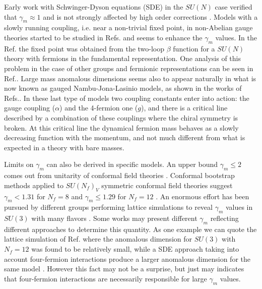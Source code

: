 \documentclass[preprint,amsmath,amssymb,superscriptaddress,showpacs,aps12pt]{revtex4}
\begin{document}
\par Early work with Schwinger-Dyson equations (SDE) in the $SU(N)$ case verified 
that $\gamma_m \approx 1$ and is not strongly affected by high order corrections \cite{g1}. Models with a slowly running
coupling, i.e. near a non-trivial fixed point, in non-Abelian gauge theories started to be studied in
Refs.\cite{apel, ap4,ap5} and seems to enhance the $\gamma_m$ values. In the Ref.\cite{apel} the fixed point was obtained from the two-loop $\beta$ function for a $SU(N)$ theory with fermions in the fundamental representation. One analysis of this problem in the case of other groups and fermionic representations can be seen in Ref.\cite{sn2}. Large mass anomalous dimensions seems also to appear naturally in what is now known as gauged Nambu-Jona-Lasinio  models, as shown in the works of Refs.\cite{yama1, yama2, mira2, yama3, mira3, yama4}. In these last type of models two coupling constants enter into action: the gauge coupling ($\alpha$) and the 4-fermion one ($g$), and there is a critical line described by a combination of these couplings where the chiral symmetry is broken. At this critical line the dynamical fermion mass behaves as a slowly decreasing function with the momentum\cite{takeuchi,kondo}, and not much different from what is expected in a theory with bare masses.

\par Limits on $\gamma_m$ can also be derived in specific models. An upper bound $\gamma_m \leq 2$ comes out from unitarity of conformal field theories \cite{g2}. Conformal bootstrap methods applied to $SU(N_f)_V$ symmetric conformal field theories suggest $\gamma_m < 1.31 $ for $N_f =8$ \cite{g3} and $\gamma_m \leq 1.29 $ for $N_f =12$ \cite{g4}.  An enormous effort has been pursued by different groups performing lattice simulations to reveal $\gamma_m$ values in $SU(3)$ with many flavors \cite{g5,g6,g7}. Some works may present
different $\gamma_m$ reflecting different approaches to determine this quantity. As one example we can quote the lattice simulation of
Ref.\cite{g7} where the anomalous dimension for $SU(3)$ with $N_f=12$ was found to be relatively small, while a SDE approach taking into account four-fermion interactions produce a larger anomalous dimension for the same model \cite{us3}. However this fact may not be a surprise, but just may indicates that
four-fermion interactions are necessarily responsible for large $\gamma_m$ values.  
\end{document}
